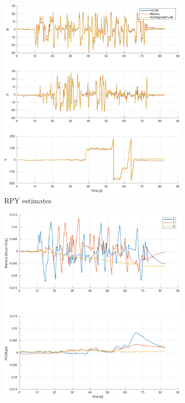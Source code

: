 \documentclass[a4paper]{article}
\begin{document}
\begin{figure}[H]
  \centering
  \begin{subfigure}[t]{0.31\textwidth}
    \includegraphics[width=\textwidth]{estrpy_ext100.pdf}
    \caption{RPY estimates}
    \label{fig:scf_meas}
  \end{subfigure}\hfill
  \begin{subfigure}[t]{0.31\textwidth}
    \includegraphics[width=\textwidth]{estbias_ext100.pdf}

\end{subfigure}
\end{figure}
\end{document}
